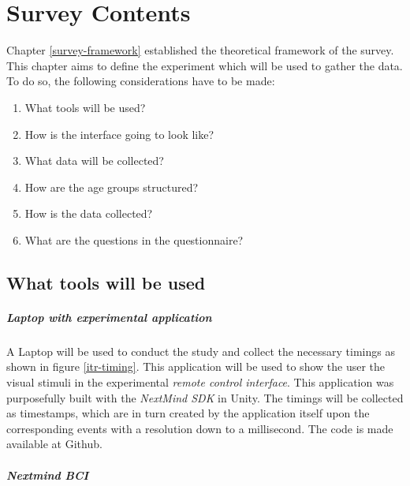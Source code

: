     \chapter{Survey Contents}\label{survey-contents}

        Chapter \ref{survey-framework} established the theoretical framework of the survey. This chapter aims to define the experiment which will be used to gather the data. To do so, the following considerations have to be made:

        \begin{enumerate}
            \item What tools will be used?
            \item How is the interface going to look like?
            \item What data will be collected?
            \item How are the age groups structured?
            \item How is the data collected?
            \item What are the questions in the questionnaire?
        \end{enumerate}

        \section{What tools will be used}

            \paragraph{Laptop with experimental application}

                A Laptop will be used to conduct the study and collect the necessary timings as shown in figure \ref*{itr-timing}. This application will be used to show the user the visual stimuli in the experimental \textit{remote control interface}. This application was purposefully built with the \textit{NextMind SDK} in Unity. The timings will be collected as timestamps, which are in turn created by the application itself upon the corresponding events with a resolution down to a millisecond. The code is made available at Github\cite[]{GitHub.04102021}.

            \paragraph{Nextmind BCI}                

